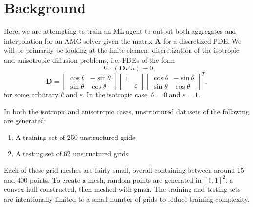 \documentclass{article}
\newcommand{\mat}[1]{\bm{{#1}}}
\newcommand{\grad}{\nabla}
\begin{document}
\section{Background}
Here, we are attempting to train an ML agent to output both aggregates and interpolation for an AMG solver given the matrix $\mat{A}$ for a discretized PDE.  We will be primarily be looking at the finite element discretization of the isotropic and anisotropic diffusion problems, i.e. PDEs of the form
\begin{equation}
  -\grad \cdot \left(\mat{D} \grad u\right) = 0,
\end{equation}
\begin{equation}
  \mat{D} = \begin{bmatrix} \cos \theta & -\sin \theta \\ \sin \theta & \cos \theta \end{bmatrix} \begin{bmatrix} 1 & \\ & \varepsilon \end{bmatrix} \begin{bmatrix} \cos \theta & -\sin \theta \\ \sin \theta & \cos \theta \end{bmatrix}^T,
\end{equation}
for some arbitrary $\theta$ and $\varepsilon$.  In the isotropic case, $\theta=0$ and $\varepsilon=1$.

In both the isotropic and anisotropic cases, unstructured datasets of the following are generated:
\begin{enumerate}
\item A training set of 250 unstructured grids
\item A testing set of 62 unstructured grids
\end{enumerate}
Each of these grid meshes are fairly small, overall containing between around 15 and 400 points.  To create a mesh, random points are generated in $\left[0,1\right]^2$, a convex hull constructed, then meshed with gmsh.  The training and testing sets are intentionally limited to a small number of grids to reduce training complexity.
\end{document}
